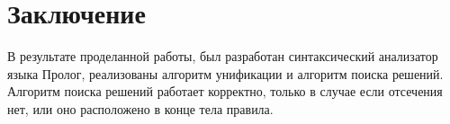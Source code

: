 \chapter{Заключение}
В результате проделанной работы, был разработан синтаксический анализатор языка Пролог, реализованы алгоритм унификации и алгоритм поиска решений.
Алгоритм поиска решений работает корректно, только в случае если отсечения нет, или оно расположено в конце тела правила.
